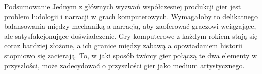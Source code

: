 \begin{frame}{Podsumowanie}
Jednym z głównych wyzwań współczesnej produkcji gier jest problem ludologii i narracji w grach komputerowych. Wymagałoby to delikatnego balansowania między mechaniką a narracją, aby zaoferować graczowi wciągające, ale satysfakcjonujące doświadczenie. Gry komputerowe z każdym rokiem stają się coraz bardziej złożone, a ich granice między zabawą a opowiadaniem historii stopniowo się zacierają. To, w jaki sposób twórcy gier połączą te dwa elementy w przyszłości, może zadecydować o przyszłości gier jako medium artystycznego.

\end{frame}
